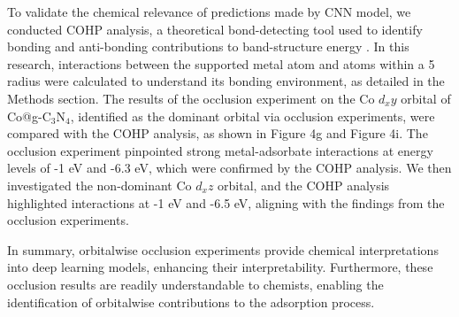 To validate the chemical relevance of predictions made by CNN model, we conducted COHP analysis, a theoretical bond-detecting tool used to identify bonding and anti-bonding contributions to band-structure energy \cite{deringer2011crystal}.
In this research, interactions between the supported metal atom and atoms within a 5 \text{\AA} radius were calculated to understand its bonding environment, as detailed in the Methods section.
The results of the occlusion experiment on the Co $d_xy$ orbital of Co@g-C$_3$N$_4$, identified as the dominant orbital via occlusion experiments, were compared with the COHP analysis, as shown in Figure 4g and Figure 4i.
The occlusion experiment pinpointed strong metal-adsorbate interactions at energy levels of -1 eV and -6.3 eV, which were confirmed by the COHP analysis.
We then investigated the non-dominant Co $d_xz$ orbital, and the COHP analysis highlighted interactions at -1 eV and -6.5 eV, aligning with the findings from the occlusion experiments.

In summary, orbitalwise occlusion experiments provide chemical interpretations into deep learning models, enhancing their interpretability.
Furthermore, these occlusion results are readily understandable to chemists, enabling the identification of orbitalwise contributions to the adsorption process.
